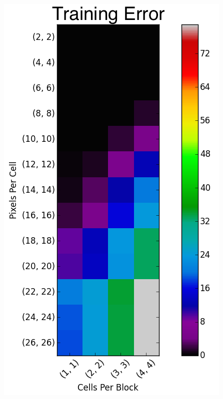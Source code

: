 \documentclass[12pt]{article}
\begin{document}
\includegraphics[scale=0.5]{../figures/train_hog_params.png}
\end{document}
